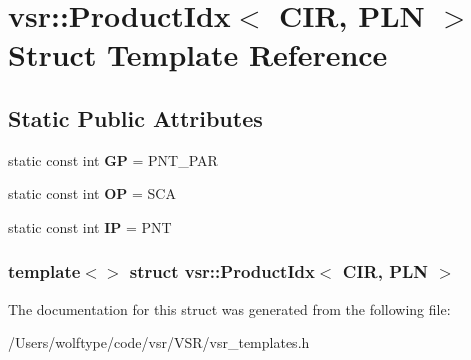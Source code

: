 \hypertarget{structvsr_1_1_product_idx_3_01_c_i_r_00_01_p_l_n_01_4}{\section{vsr\-:\-:Product\-Idx$<$ C\-I\-R, P\-L\-N $>$ Struct Template Reference}
\label{structvsr_1_1_product_idx_3_01_c_i_r_00_01_p_l_n_01_4}
}
\subsection*{Static Public Attributes}
\begin{DoxyCompactItemize}
\item 
\hypertarget{structvsr_1_1_product_idx_3_01_c_i_r_00_01_p_l_n_01_4_a1220214af23c7c488d7d479ff4fe2cd4}{static const int {\bfseries G\-P} = P\-N\-T\-\_\-\-P\-A\-R}\label{structvsr_1_1_product_idx_3_01_c_i_r_00_01_p_l_n_01_4_a1220214af23c7c488d7d479ff4fe2cd4}

\item 
\hypertarget{structvsr_1_1_product_idx_3_01_c_i_r_00_01_p_l_n_01_4_a0773089fac79f29cee3c0af91a81f343}{static const int {\bfseries O\-P} = S\-C\-A}\label{structvsr_1_1_product_idx_3_01_c_i_r_00_01_p_l_n_01_4_a0773089fac79f29cee3c0af91a81f343}

\item 
\hypertarget{structvsr_1_1_product_idx_3_01_c_i_r_00_01_p_l_n_01_4_a5fe7f738ebfd8caf83a31ed443d2ba10}{static const int {\bfseries I\-P} = P\-N\-T}\label{structvsr_1_1_product_idx_3_01_c_i_r_00_01_p_l_n_01_4_a5fe7f738ebfd8caf83a31ed443d2ba10}

\end{DoxyCompactItemize}
\subsubsection*{template$<$$>$ struct vsr\-::\-Product\-Idx$<$ C\-I\-R, P\-L\-N $>$}



The documentation for this struct was generated from the following file\-:\begin{DoxyCompactItemize}
\item 
/\-Users/wolftype/code/vsr/\-V\-S\-R/vsr\-\_\-templates.\-h\end{DoxyCompactItemize}
